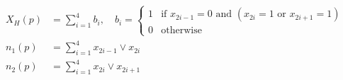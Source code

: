 \documentclass{standalone}
\begin{document}
\begin{equation*}
\begin{aligned}
X_H(p) &= \sum_{i=1}^4 b_i, \quad b_i = 
	\begin{cases}
		1 & \text{if } x_{2i-1} = 0 \text{ and } \left( x_{2i} = 1 \text{ or } x_{2i+1} = 1 \right ) \\
		0 & \text{otherwise}
	\end{cases} \\
n_1(p) &= \sum_{i=1}^4 x_{2i-1} \vee x_{2i} \\
n_2(p) &= \sum_{i=1}^4 x_{2i} \vee x_{2i+1}
\end{aligned}
\end{equation*}
\end{document}
